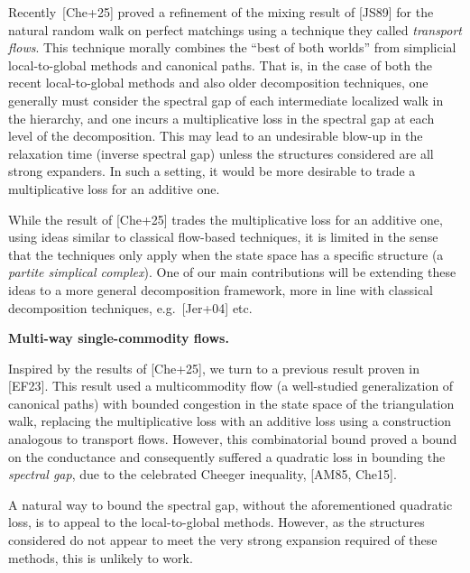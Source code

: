 \documentclass[10pt,a4paper]{article}
\begin{document}
Recently [Che+25] proved a refinement of the mixing result of [JS89] for the natural random walk on perfect matchings using a technique they called \emph{transport flows}. This technique morally combines the “best of both worlds” from simplicial local-to-global methods and canonical paths. That is, in the case of both the recent local-to-global methods and also older decomposition techniques, one generally must consider the spectral gap of each intermediate localized walk in the hierarchy, and one incurs a multiplicative loss in the spectral gap at each level of the decomposition. This may lead to an undesirable blow-up in the relaxation time (inverse spectral gap) unless the structures considered are all strong expanders. In such a setting, it would be more desirable to trade a multiplicative loss for an additive one.\par




While the result of [Che+25] trades the multiplicative loss for an additive one, using ideas similar to classical flow-based techniques, it is limited in the sense that the techniques only apply when the state space has a specific structure (a \emph{partite simplical complex}). One of our main contributions will be extending these ideas to a more general decomposition framework, more in line with classical decomposition techniques, e.g. [Jer+04] etc.\par





\par\medskip\noindent\textbf{Multi-way single-commodity flows.}\par




Inspired by the results of [Che+25], we turn to a previous result proven in
[EF23]. This result used a multicommodity flow (a well-studied generalization of canonical paths) with bounded congestion in the state space of the triangulation walk, replacing the multiplicative loss with an additive loss using a construction analogous to transport flows. However, this combinatorial bound proved a bound on the conductance and consequently suffered a quadratic loss in bounding the \emph{spectral gap}, due to the celebrated Cheeger inequality, [AM85, Che15].\par




A natural way to bound the spectral gap, without the aforementioned quadratic loss, is to appeal to the local-to-global methods. However, as the structures considered do not appear to meet the very strong expansion required of these methods, this is unlikely to work.\par
\end{document}
